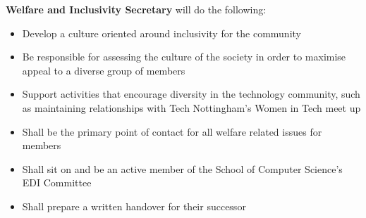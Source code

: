 \begin{subclause}
  \textbf{Welfare and Inclusivity Secretary} will do the following:
  \begin{itemize}[label=--,topsep=0em,itemsep=0em]
    \item Develop a culture oriented around inclusivity for the community
    \item Be responsible for assessing the culture of the society in order to maximise appeal to a diverse group of members
    \item Support activities that encourage diversity in the technology community, such as maintaining relationships with Tech Nottingham’s Women in Tech meet up
    \item Shall be the primary point of contact for all welfare related issues for members
    \item Shall sit on and be an active member of the School of Computer Science's EDI Committee
    \item Shall prepare a written handover for their successor
  \end{itemize}
\end{subclause}

